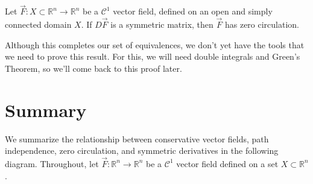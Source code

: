 \documentclass{ximera}
\begin{document}
\begin{proposition}
Let $\vec{F}:X\subset\mathbb{R}^n\rightarrow \mathbb{R}^n$ be a $\mathcal{C}^1$ vector field, defined on an open and simply connected domain $X$. If $D\vec{F}$ is a symmetric matrix, then $\vec{F}$ has zero circulation.
\end{proposition}

Although this completes our set of equivalences, we don't yet have the tools that we need to prove this result. For this, we will need double integrals and Green's Theorem, so we'll come back to this proof later.

\section*{Summary}

We summarize the relationship between conservative vector fields, path independence, zero circulation, and symmetric derivatives in the following diagram. Throughout, let $\vec{F}:\mathbb{R}^n \to \mathbb{R}^n$ be a $\mathcal{C}^1$ vector field defined on a set $X \subset \mathbb{R}^n$.  

\end{document}
